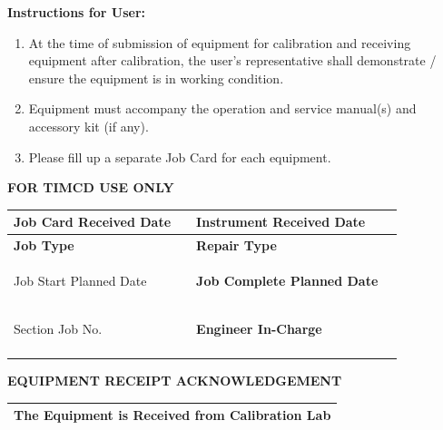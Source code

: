 \documentclass[a4paper,10pt]{article}
\newcommand{\sectiontitle}[1]{
\vspace{0.5mm}
\colorbox{sectiongray}{
\parbox{\dimexpr\linewidth-2\fboxsep}{
\textbf{#1}
}}
\vspace{0.5mm}
}
\begin{document}
\begin{tcolorbox}[
colback=sectiongray,
colframe=black,
boxrule=0.5pt,
left=2mm,
right=2mm,
top=1mm,
bottom=1mm]

\textbf{Instructions for User:}

\begin{enumerate}
\item At the time of submission of equipment for calibration and receiving equipment after calibration, the user's representative shall demonstrate / ensure the equipment is in working condition.

\item Equipment must accompany the operation and service manual(s) and accessory kit (if any).

\item Please fill up a separate Job Card for each equipment.
\end{enumerate}

\end{tcolorbox}


\sectiontitle{FOR TIMCD USE ONLY}

\begin{tabularx}{\textwidth}{|>{\bfseries}l|X|>{\bfseries}l|X|}
\hline
Job Card Received Date &
&
Instrument Received Date &
\\
\hline

Job Type &
&
Repair Type &
\\
\hline

Job Start Planned Date &
&
Job Complete Planned Date &
\\
\hline

Section Job No. &
&
Engineer In-Charge &
\\
\hline

\multicolumn{1}{|>{\bfseries}l|}{Job Status}
&
\multicolumn{3}{l|}{}
\\
\hline

\end{tabularx}


\sectiontitle{EQUIPMENT RECEIPT ACKNOWLEDGEMENT}

\begin{tabularx}{\textwidth}{|X|}
\hline

\textbf{The Equipment is Received from Calibration Lab}

\\[2mm]
\hline

\end{tabularx}
\end{document}
